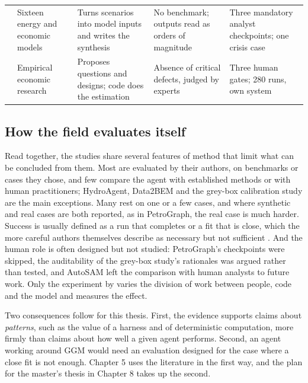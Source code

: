 \begin{table}[htbp]
\begin{tabularx}{\textwidth}{@{}p{2.3cm}XXXX@{}}
\citet{golden2026agentic} & Sixteen energy and economic models & Turns scenarios into model inputs and writes the synthesis & No benchmark; outputs read as orders of magnitude & Three mandatory analyst checkpoints; one crisis case \\
\citet{zhu2026human} & Empirical economic research & Proposes questions and designs; code does the estimation & Absence of critical defects, judged by experts & Three human gates; 280 runs, own system \\
\bottomrule
\end{tabularx}
\end{table}

\subsection{How the field evaluates itself}

Read together, the studies share several features of method that limit what can be concluded from them.
Most are evaluated by their authors, on benchmarks or cases they chose, and few compare the agent with established methods or with human practitioners; HydroAgent, Data2BEM and the grey-box calibration study are the main exceptions.
Many rest on one or a few cases, and where synthetic and real cases are both reported, as in PetroGraph, the real case is much harder.
Success is usually defined as a run that completes or a fit that is close, which the more careful authors themselves describe as necessary but not sufficient \citep{li2026moosenger, li2026optargus}.
And the human role is often designed but not studied: PetroGraph's checkpoints were skipped, the auditability of the grey-box study's rationales was argued rather than tested, and AutoSAM left the comparison with human analysts to future work.
Only the experiment by \citet{zhu2026human} varies the division of work between people, code and the model and measures the effect.

Two consequences follow for this thesis.
First, the evidence supports claims about \emph{patterns}, such as the value of a harness and of deterministic computation, more firmly than claims about how well a given agent performs.
Second, an agent working around GGM would need an evaluation designed for the case where a close fit is not enough.
Chapter 5 uses the literature in the first way, and the plan for the master's thesis in Chapter 8 takes up the second.
